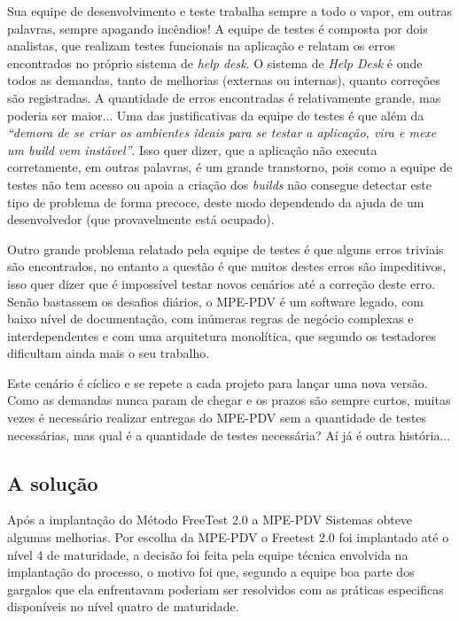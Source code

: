 Sua equipe de desenvolvimento e teste trabalha sempre a todo o vapor, em outras palavras, sempre apagando incêndios! A equipe de testes é composta por dois analistas, que realizam testes funcionais na aplicação e relatam os erros encontrados no próprio sistema de \textit{help desk}. O sistema de \textit{Help Desk} é onde todos as demandas, tanto de melhorias (externas ou internas), quanto correções são registradas. A quantidade de erros encontradas é relativamente grande, mas poderia ser maior... Uma das justificativas da equipe de testes é que além da \textit{“demora de se criar os ambientes ideais para se testar a aplicação, vira e mexe um build vem instável”}. Isso quer dizer, que a aplicação não executa corretamente, em outras palavras, é um grande transtorno, pois como a equipe de testes não tem acesso ou apoia a criação dos \textit{builds} não consegue detectar este tipo de problema de forma precoce, deste modo dependendo da ajuda de um desenvolvedor (que provavelmente está ocupado).

Outro grande problema relatado pela equipe de testes é que alguns erros triviais são encontrados, no entanto a questão é que muitos destes erros são impeditivos, isso quer dizer que é impossível testar novos cenários até a correção deste erro. Senão bastassem os desafios diários, o MPE-PDV é um software legado, com baixo nível de documentação, com inúmeras regras de negócio complexas e interdependentes e com uma arquitetura monolítica, que segundo os testadores dificultam ainda mais o seu trabalho.

Este cenário é cíclico e se repete a cada projeto para lançar uma nova versão. Como as demandas nunca param de chegar e os prazos são sempre curtos, muitas vezes é necessário realizar entregas do MPE-PDV sem a quantidade de testes necessárias, mas qual é a quantidade de testes necessária? Aí já é outra história...

\subsection{A solução}

Após a implantação do Método FreeTest 2.0 a MPE-PDV Sistemas obteve algumas melhorias. Por escolha da MPE-PDV o Freetest 2.0 foi implantado até o nível 4 de maturidade, a decisão foi feita pela equipe técnica envolvida na implantação do processo, o motivo foi que, segundo a equipe boa parte dos gargalos que ela enfrentavam poderiam ser resolvidos com as práticas especificas disponíveis no nível quatro de maturidade.

